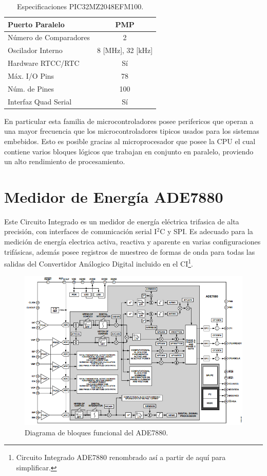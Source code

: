 \documentclass[letterpaper,12pt,oneside]{book}
\begin{document}
\begin{table}[!ht]
\begin{tabular}{ l | c }
					\hline
					Puerto Paralelo & PMP \\
					\hline
					Número de Comparadores & 2 \\
					\hline
					Oscilador Interno & 8 [MHz], 32 [kHz] \\
					\hline
					Hardware RTCC/RTC & Sí \\
					\hline
					Máx. I/O Pins & 78 \\
					\hline
					Núm. de Pines & 100 \\
					\hline
					Interfaz Quad Serial & Sí \\
				\end{tabular}
				\caption{Especificaciones PIC32MZ2048EFM100.}
				\label{EspPic32}
		\end{table}

		En particular esta familia de microcontroladores posee perifericos que operan a una mayor frecuencia que los microcontroladores tipicos usados para los sistemas embebidos. Esto es posible gracias al microprocesador que posee la CPU el cual contiene varios bloques lógicos que trabajan en conjunto en paralelo, proviendo un alto rendimiento de procesamiento.
		\section{Medidor de Energía ADE7880}
		Este Circuito Integrado es un medidor de energía eléctrica trifasica de alta precisión, con interfaces de comunicación serial I$^2$C y SPI. Es adecuado para la medición de energía electrica activa, reactiva y aparente en varias configuraciones trifásicas, además posee registros de muestreo de formas de onda para todas las salidas del Convertidor Análogico Digital incluido en el CI\footnote{Circuito Integrado ADE7880 renombrado así a partir de aquí para simplificar.}.

		\begin{figure}[!htpb]
			\centering
			\includegraphics[scale = 0.8]{Material de Consulta/ADE7880FuncDiag.PNG}
			\caption[Diagrama de Bloques del ADE7880]{Diagrama de bloques funcional del ADE7880.}
			\label{FuncDiag}
		\end{figure}
\end{document}
